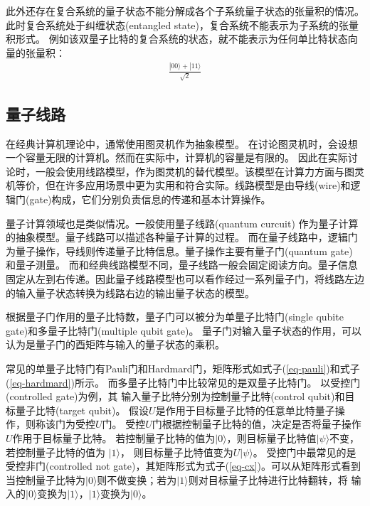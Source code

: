 此外还存在复合系统的量子状态不能分解成各个子系统量子状态的张量积的情况。此时复合系统处于纠缠状态(entangled state)，复合系统不能表示为子系统的张量积形式。
例如该双量子比特的复合系统的状态，就不能表示为任何单比特状态向量的张量积：
\begin{align}
    \frac{|00\rangle+|11\rangle}{\sqrt{2}}
\end{align}
\subsection{量子线路}
\label{sec-cir}
在经典计算机理论中，通常使用图灵机作为抽象模型。
在讨论图灵机时，会设想一个容量无限的计算机。然而在实际中，计算机的容量是有限的。
因此在实际讨论时，一般会使用线路模型，作为图灵机的替代模型。该模型在计算力方面与图灵机等价，但在许多应用场景中更为实用和符合实际。线路模型是由导线(wire)和逻辑门(gate)构成，它们分别负责信息的传递和基本计算操作。

量子计算领域也是类似情况。一般使用量子线路(quantum curcuit) 作为量子计算的抽象模型。量子线路可以描述各种量子计算的过程。
而在量子线路中，逻辑门为量子操作，导线则传递量子比特信息。量子操作主要有量子门(quantum gate) 和量子测量。
而和经典线路模型不同，量子线路一般会固定阅读方向。量子信息固定从左到右传递。因此量子线路模型也可以看作经过一系列量子门，将线路左边的输入量子状态转换为线路右边的输出量子状态的模型。

根据量子门作用的量子比特数，量子门可以被分为单量子比特门(single qubite gate)和多量子比特门(multiple qubit gate)。
量子门对输入量子状态的作用，可以认为是量子门的酉矩阵与输入的量子状态的乘积。

常见的单量子比特门有Pauli门和Hardmard门，矩阵形式如式子(\ref{eq-pauli})和式子(\ref{eq-hardmard})所示。
而多量子比特门中比较常见的是双量子比特门。
以受控门(controlled gate)为例，其
输入量子比特分别为控制量子比特(control qubit)和目标量子比特(target qubit)。
假设$U $是作用于目标量子比特的任意单比特量子操作，则称该门为受控$U$门。
受控$U$门根据控制量子比特的值，决定是否将量子操作$U$作用于目标量子比特。
若控制量子比特的值为\(|0\rangle\)，则目标量子比特值\(|\psi\rangle\)不变，若控制量子比特的值为
\(|1\rangle\)， 则目标量子比特值变为\(U|\psi\rangle\)。
受控门中最常见的是受控非门(controlled not gate)，其矩阵形式为式子(\ref{eq-cx})。可以从矩阵形式看到当控制量子比特为\(|0\rangle\)则不做变换；若为\(|1\rangle\)则对目标量子比特进行比特翻转，将
输入的\(|0\rangle\)变换为\(|1\rangle\)，\(|1\rangle\)变换为\(|0\rangle\)。

